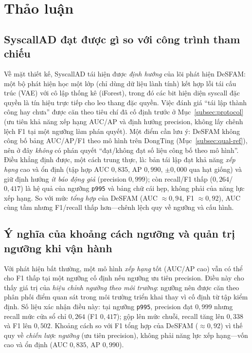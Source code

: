 \section{Thảo luận}
\label{sec:discussion}

\subsection{SyscallAD đạt được gì so với công trình tham chiếu}
Về mặt thiết kế, SyscallAD tái hiện được \emph{định hướng} của lõi phát hiện DeSFAM:
một bộ phát hiện học một lớp (chỉ dùng dữ liệu lành tính) kết hợp lỗi tái cấu trúc
(VAE) với cô lập thống kê (iForest), trong đó các bit hiện diện syscall đặc quyền là
tín hiệu trực tiếp cho leo thang đặc quyền. Việc đánh giá ``tái lập thành công hay
chưa'' được căn theo tiêu chí đã cố định trước ở Mục~\ref{subsec:protocol} (ưu tiên
khả năng xếp hạng AUC/AP và định hướng precision, không lấy chênh lệch F1 tại một
ngưỡng làm phán quyết). Một điểm cần lưu ý: DeSFAM không công bố bảng AUC/AP/F1
theo mô hình trên DongTing (Mục~\ref{subsec:qual-ref}), nên ở đây \emph{không} có
phán quyết ``đạt/không đạt số liệu công bố theo mô hình''. Điều khẳng định được, một
cách trung thực, là: bản tái lập đạt khả năng \emph{xếp hạng} cao và ổn định (tập hợp
AUC $0{,}835$, AP $0{,}990$, $\pm 0{,}000$ qua hạt giống) và giữ định hướng \emph{ít
báo động giả} (precision $0{,}999$); còn recall/F1 thấp ($0{,}264$/$0{,}417$) là hệ
quả của ngưỡng \texttt{p995} và bảng chữ cái hẹp, không phải của năng lực xếp hạng.
So với mức \emph{tổng hợp} của DeSFAM (AUC $\approx 0{,}94$, F1 $\approx 0{,}92$),
AUC cùng tầm nhưng F1/recall thấp hơn---chênh lệch quy về ngưỡng và cấu hình.

\subsection{Ý nghĩa của khoảng cách ngưỡng và quản trị ngưỡng khi vận hành}
Với phát hiện bất thường, một mô hình \emph{xếp hạng} tốt (AUC/AP cao) vẫn có thể
cho F1 thấp tại một ngưỡng cố định nếu ngưỡng ưu tiên precision. Điều này cho thấy
giá trị của \emph{hiệu chỉnh ngưỡng theo môi trường}: ngưỡng nên được căn theo phân
phối điểm quan sát trong môi trường triển khai thay vì cố định từ tập kiểm định.
Số liệu xác nhận điều này: tại ngưỡng \texttt{p995}, precision đạt $0{,}999$ nhưng
recall mức cửa sổ chỉ $0{,}264$ (F1 $0{,}417$); gộp lên mức chuỗi, recall tăng lên
$0{,}338$ và F1 lên $0{,}502$. Khoảng cách so với F1 tổng hợp của DeSFAM ($\approx
0{,}92$) vì thế quy về \emph{chiến lược ngưỡng} (ưu tiên precision), không phải năng
lực xếp hạng---vốn cao và ổn định (AUC $0{,}835$, AP $0{,}990$).

